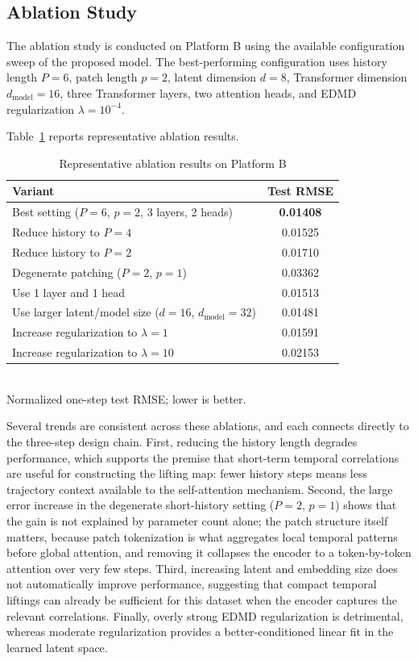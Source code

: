 \documentclass[journal]{IEEEtran}
\begin{document}
\subsection{Ablation Study}

The ablation study is conducted on Platform B using the available configuration sweep of the proposed model. The best-performing configuration uses history length $P=6$, patch length $p=2$, latent dimension $d=8$, Transformer dimension $d_{\mathrm{model}}=16$, three Transformer layers, two attention heads, and EDMD regularization $\lambda=10^{-4}$.

Table~\ref{tab:ablation_platform_b} reports representative ablation results.

\begin{table}[!t]
\renewcommand{\arraystretch}{1.2}
\caption{Representative ablation results on Platform B}
\label{tab:ablation_platform_b}
\centering
\begin{tabular}{>{\raggedright\arraybackslash}p{}c}
\hline\hline
Variant & Test RMSE \\
\hline
Best setting ($P=6$, $p=2$, 3 layers, 2 heads) & \textbf{0.01408} \\
Reduce history to $P=4$ & 0.01525 \\
Reduce history to $P=2$ & 0.01710 \\
Degenerate patching ($P=2$, $p=1$) & 0.03362 \\
Use 1 layer and 1 head & 0.01513 \\
Use larger latent/model size ($d=16$, $d_{\mathrm{model}}=32$) & 0.01481 \\
Increase regularization to $\lambda=1$ & 0.01591 \\
Increase regularization to $\lambda=10$ & 0.02153 \\
\hline\hline
\end{tabular}
\\[2pt]
{\footnotesize Normalized one-step test RMSE; lower is better.}
\end{table}

Several trends are consistent across these ablations, and each connects directly to the three-step design chain. First, reducing the history length degrades performance, which supports the premise that short-term temporal correlations are useful for constructing the lifting map: fewer history steps means less trajectory context available to the self-attention mechanism. Second, the large error increase in the degenerate short-history setting ($P=2$, $p=1$) shows that the gain is not explained by parameter count alone; the patch structure itself matters, because patch tokenization is what aggregates local temporal patterns before global attention, and removing it collapses the encoder to a token-by-token attention over very few steps. Third, increasing latent and embedding size does not automatically improve performance, suggesting that compact temporal liftings can already be sufficient for this dataset when the encoder captures the relevant correlations. Finally, overly strong EDMD regularization is detrimental, whereas moderate regularization provides a better-conditioned linear fit in the learned latent space.
\end{document}
